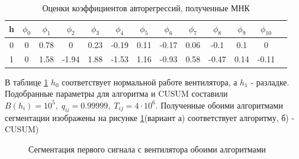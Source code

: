 \documentclass[12pt,a4paper]{article}
\begin{document}
\begin{table}[h]
\caption{Оценки коэффициентов авторегрессий, полученные МНК}
\label{AR_params_table}
\begin{tabular}{|c|c|c|c|c|c|c|c|c|c|c|c|c|}
\hline
h & $\phi_0$ & $\phi_1$ & $\phi_2$ & $\phi_3$ & $\phi_4$ & $\phi_5$ & $\phi_6$ & $\phi_7$ & $\phi_8$ & $\phi_9$ & $\phi_{10}$\\
\hline
0 & 0 & 0.78 & 0 & 0.23 & -0.19 & 0.11 & -0.17 & 0.06 & -0.1 & 0.1 & 0\\
\hline
1 & 0 & 1.58 & -1.94 & 1.88 & -1.53 & 1.16 & -0.93 & 0.58 & -0.47 & 0.14 & -0.11\\
\hline
\end{tabular}
\end{table}

В таблице \ref{AR_params_table} $h_0$ соответствует нормальной работе вентилятора, а $h_1$ - разладке. Подобранные параметры для алгоритма\cite{burobin} и CUSUM составили $B(h_i) = 10^5,\; q_{ii} = 0.99999,\; T_{ij} = 4 \cdot 10^6.$ Полученные обоими алгоритмами сегментации изображены на рисунке \ref{cropped_1}(вариант а) соответствует алгоритму\cite{burobin}, б) - CUSUM)
\begin{figure}[h]
\begin{minipage}[h]{0.49\linewidth}
\end{minipage}
\begin{minipage}[h]{0.49\linewidth}
\end{minipage}
\caption{Сегментация первого сигнала с вентилятора обоими алгоритмами}
\label{cropped_1}
\end{figure}
\end{document}
